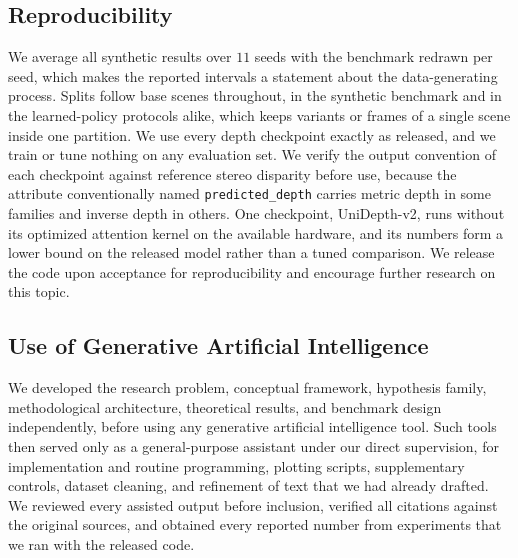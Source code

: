\documentclass{article} %
\theoremstyle{defstyle}
\theoremstyle{plain}
\begin{document}
\subsection{Reproducibility}
\label{sec:supp-repro}

We average all synthetic results over $11$ seeds with the benchmark redrawn per seed, which
makes the reported intervals a statement about the data-generating process. Splits follow base
scenes throughout, in the synthetic benchmark and in the learned-policy protocols alike, which
keeps variants or frames of a single scene inside one partition. We use every depth checkpoint
exactly as released, and we train or tune nothing on any evaluation set. We verify the output
convention of each checkpoint against reference stereo disparity before use, because the
attribute conventionally named \texttt{predicted\_depth} carries metric depth in some families
and inverse depth in others. One checkpoint, UniDepth-v2, runs without its optimized attention
kernel on the available hardware, and its numbers form a lower bound on the released model
rather than a tuned comparison. We release the code upon acceptance for reproducibility and encourage further research on this topic.



\subsection{Use of Generative Artificial Intelligence}
\label{sec:supp-ai-disclosure}

We developed the research problem, conceptual framework, hypothesis family, methodological
architecture, theoretical results, and benchmark design independently, before using any
generative artificial intelligence tool. Such tools then served only as a general-purpose
assistant under our direct supervision, for implementation and routine programming, plotting
scripts, supplementary controls, dataset cleaning, and refinement of text that we had already
drafted. We reviewed every assisted output before inclusion, verified all citations against the
original sources, and obtained every reported number from experiments that we ran with the
released code.
\end{document}

